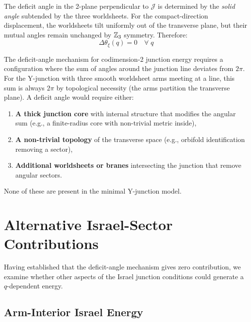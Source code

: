 The deficit angle in the 2-plane perpendicular to $\mathcal{J}$ is
determined by the \emph{solid angle} subtended by the three worldsheets.
For the compact-direction displacement, the worldsheets tilt uniformly
out of the transverse plane, but their mutual angles remain unchanged
by $\mathbb{Z}_3$ symmetry. Therefore:
\begin{equation}
    \Delta\theta_{\xi}(q) = 0 \quad \forall\; q
    \label{eq:deficit_compact}
\end{equation}

\begin{edcopenbox}[title=Structural Limitation]
The deficit-angle mechanism for codimension-2 junction energy
requires a configuration where the sum of angles around the
junction line deviates from $2\pi$. For the Y-junction with
three smooth worldsheet arms meeting at a line, this sum is
always $2\pi$ by topological necessity (the arms partition
the transverse plane). A deficit angle would require either:
\begin{enumerate}
    \item \textbf{A thick junction core} with internal structure that
          modifies the angular sum (e.g., a finite-radius core with
          non-trivial metric inside),
    \item \textbf{A non-trivial topology} of the transverse space
          (e.g., orbifold identification removing a sector),
    \item \textbf{Additional worldsheets or branes} intersecting
          the junction that remove angular sectors.
\end{enumerate}
None of these are present in the minimal Y-junction model.
\tagDc
\end{edcopenbox}

\section{Alternative Israel-Sector Contributions}
\label{sec:P2WP2:alternatives}

Having established that the deficit-angle mechanism gives zero
contribution, we examine whether other aspects of the Israel junction
conditions could generate a $q$-dependent energy.

\subsection{Arm-Interior Israel Energy}

